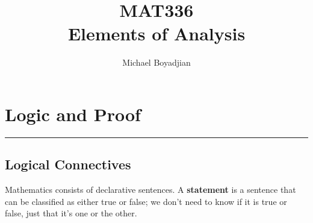 \documentclass[11pt]{article}
\begin{document}
\title{MAT336  \\ Elements of Analysis}
\author{Michael Boyadjian}
\maketitle
\pagebreak

\tableofcontents

\pagebreak

\bigskip
\bigskip
\bigskip


\section{Logic and Proof}
\hrule \vspace{15pt}

\subsection{Logical Connectives}
Mathematics consists of declarative sentences. A \textbf{statement} is a sentence that can be classified as either true or false; we don't  need to know if it is true or false, just that it's one or the other. \\
\end{document}
